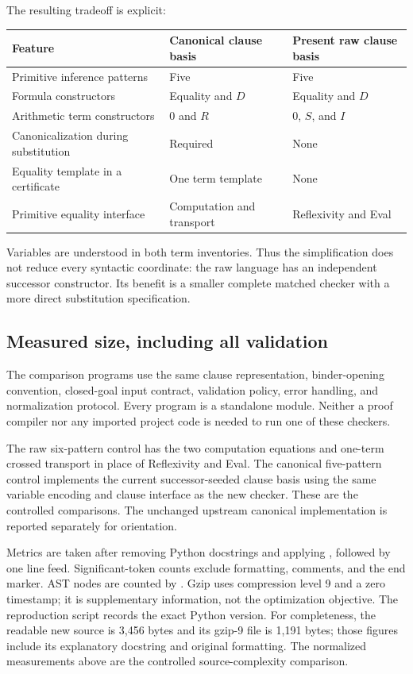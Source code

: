 The resulting tradeoff is explicit:
\begin{center}
\begin{tabular}{@{}p{.31\linewidth}p{.28\linewidth}p{.29\linewidth}@{}}
\toprule
Feature & Canonical clause basis & Present raw clause basis\\
\midrule
Primitive inference patterns & Five & Five\\
Formula constructors & Equality and $D$ & Equality and $D$\\
Arithmetic term constructors & $0$ and $R$ & $0$, $S$, and $I$\\
Canonicalization during substitution & Required & None\\
Equality template in a certificate & One term template & None\\
Primitive equality interface & Computation and transport & Reflexivity and Eval\\
\bottomrule
\end{tabular}
\end{center}
Variables are understood in both term inventories. Thus the simplification
does not reduce every syntactic coordinate: the raw language has an
independent successor constructor. Its benefit is a smaller complete
matched checker with a more direct substitution specification.

\subsection{Measured size, including all validation}

The comparison programs use the same clause representation, binder-opening
convention, closed-goal input contract, validation policy, error handling,
and normalization protocol. Every program is a standalone module.
Neither a proof compiler nor any imported project code is needed to run
one of these checkers.



The raw six-pattern control has the two computation equations and
one-term crossed transport in place of Reflexivity and Eval. The canonical
five-pattern control implements the current successor-seeded clause
basis using the same variable encoding and clause interface as the new
checker. These are the controlled comparisons. The unchanged upstream
canonical implementation is reported separately for orientation.

Metrics are taken after removing Python docstrings and applying
, followed by one line feed. Significant-token counts
exclude formatting, comments, and the end marker. AST nodes are counted
by . Gzip uses compression level 9 and a zero timestamp;
it is supplementary information, not the optimization objective.
The reproduction script records the exact Python version.
For completeness, the readable new source is 3,456 bytes and its
gzip-9 file is 1,191 bytes; those figures include its explanatory
docstring and original formatting. The normalized measurements above
are the controlled source-complexity comparison.

